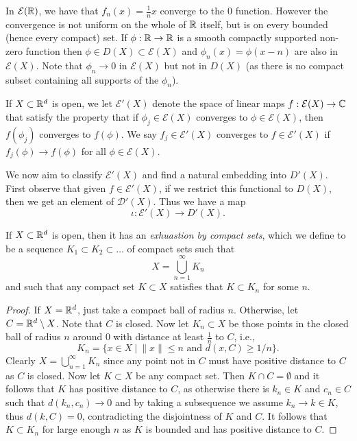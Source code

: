 \documentclass[twoside, a4paper, 10pt]{amsart}
\begin{document}
\begin{eg} In $\mathcal{E}(\mathbb{R})$, we have that $f_n(x) = \frac{1}{n}x$ converge to the $0$ function. However the convergence is not uniform on the whole of $\mathbb{R}$ itself, but is on every bounded (hence every compact) set. If $\phi:\mathbb{R} \to \mathbb{R}$ is a smooth compactly supported non-zero function then $\phi \in D(X) \subset \mathcal{E}(X)$ and $\phi_n(x) = \phi(x-n)$ are also in $\mathcal{E}(X)$. Note that $\phi_n \to 0$ in $\mathcal{E}(X)$ but not in $D(X)$ (as there is no compact subset containing all supports of the $\phi_n$). \end{eg}

\begin{mydef} If $X \subset \mathbb{R}^d$ is open, we let $\mathcal{E}'(X)$ denote the space of linear maps $f:\mathcal{E}(X) \to \mathbb{C}$ that satisfy the property that if $\phi_j \in \mathcal{E}(X)$ converges to $\phi \in \mathcal{E}(X)$, then $f(\phi_j)$ converges to $f(\phi)$. We say $f_j \in \mathcal{E}'(X)$ converges to $f \in \mathcal{E}'(X)$ if $f_j(\phi) \to f(\phi)$ for all $\phi \in \mathcal{E}(X)$.

\end{mydef}

We now aim to classify $\mathcal{E}'(X)$ and find a natural embedding into $D'(X)$. First observe that given $f \in \mathcal{E}'(X)$, if we restrict this functional to $D(X)$, then we get an element of $\mathcal{D}'(X)$. Thus we have a map $$\iota:\mathcal{E}'(X) \to D'(X).$$

\begin{lemma} If $X \subset \mathbb{R}^d$ is open, then it has an \textit{exhuastion by compact sets}, which we define to be a sequence $K_1 \subset K_2 \subset \ldots$ of compact sets such that $$X = \bigcup_{n=1}^{\infty} K_n$$ and such that any compact set $K \subset X$ satisfies that $K \subset K_n$ for some $n$.

\end{lemma}

\begin{proof} If $X = \mathbb{R}^d$, just take a compact ball of radius $n$. Otherwise, let $C = \mathbb{R}^d \setminus X$. Note that $C$ is closed. Now let $K_n \subset X$ be those points in the closed ball of radius $n$ around $0$ with distance at least $\frac{1}{n}$ to $C$, i.e., $$K_n = \{x \in X ~|~ \|x\| \leq n \text{ and } d(x, C) \geq 1/n \}.$$ Clearly $X = \bigcup_{n=1}^{\infty} K_n$ since any point not in $C$ must have positive distance to $C$ as $C$ is closed. Now let $K \subset X$ be any compact set. Then $K \cap C = \emptyset$ and it follows that $K$ has positive distance to $C$, as otherwise there is $k_n \in K$ and $c_n \in C$ such that $d(k_n, c_n) \to 0$ and by taking a subsequence we assume $k_n \to k \in K$, thus $d(k, C) = 0$, contradicting the disjointness of $K$ and $C$. It follows that $K \subset K_n$ for large enough $n$ as $K$ is bounded and has positive distance to $C$.

\end{proof}
\end{document}
